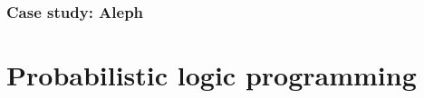 \subsubsection{Case study: Aleph}


\section{Probabilistic logic programming}














\cleardoublepage

